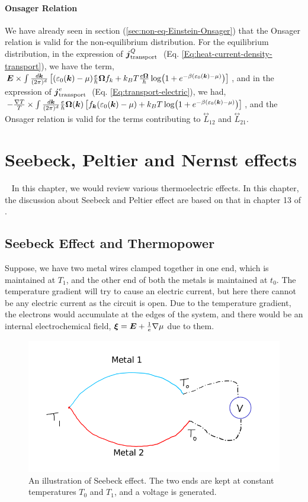 \documentclass{report}
\renewcommand\vec[1]{\ensuremath\boldsymbol{#1}} %
\begin{document}
\subsubsection{Onsager Relation}
We have already seen in section (\ref{sec:non-eq-Einstein-Onsager}) that the Onsager relation is valid for the non-equilibrium distribution. For the equilibrium distribution, in the expression of $\vec{j}_{\text {transport }}^{Q}$ (Eq. \eqref{Eq:heat-current-density-transport}), we have the term, $\vec{E} \times \int \frac{d\vec{k}}{(2\pi)^d} \left[(\varepsilon_0(\vec{k})-\mu) \frac{e}{\hbar} \vec{\Omega} f_{k} + k_{B} T \frac{e \vec{\Omega}}{\hbar} \log(1 + e^{-\beta(\varepsilon_0(\vec{k}) - \mu)})\right]$, and in the expression of $\vec{j}_{\text {transport }}^{e}$ (Eq. \eqref{Eq:transport-electric}), we had, $-\frac{\nabla T}{T}  \times \int  \frac{d\vec{k}}{(2\pi)^d} \frac{e}{\hbar} \vec{\Omega}(\vec{k}) \left[f_{\vec{k}} (\varepsilon_0(\vec{k}) - \mu) + k_B T \log(1 + e^{-\beta(\varepsilon_0(\vec{k}) - \mu)})\right]$, and the Onsager relation is valid for the terms contributing to $\stackrel{\leftrightarrow}{L}_{12}$ and $\stackrel{\leftrightarrow}{L}_{21}$.
\chapter{Seebeck, Peltier and Nernst effects}~\label{chap:Seebeck-Peltier-Nernst}
In this chapter, we would review various thermoelectric effects. In this chapter, the discussion about Seebeck and Peltier effect are based on that in chapter 13 of \cite{book:AshcroftMermin76}.
\section{Seebeck Effect and Thermopower}

Suppose, we have two metal wires clamped together in one end, which is maintained at $T_1$, and the other end of both the metals is maintained at $t_0$. The temperature gradient will try to cause an electric current, but here there cannot be any electric current as the circuit is open. Due to the temperature gradient, the electrons would accumulate at the edges of the system, and there would be an internal electrochemical field, $\vec{\xi} = \vec{E} + \frac{1}{e} \nabla \mu$ due to them.
\begin{figure}[h!]
	\centering
	\includegraphics[width=0.7\linewidth]{seebeck}
	\caption{An illustration of Seebeck effect. The two ends are kept at constant temperatures $T_0$ and $T_1$, and a voltage is generated.}
	\label{fig:seebeck}
\end{figure}
\end{document}
